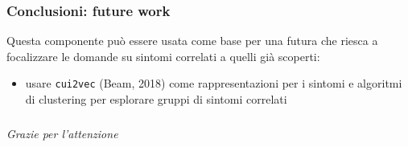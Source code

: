 \documentclass{beamer}
\begin{document}
\begin{frame}
\frametitle{Conclusioni: future work}
Questa componente può essere usata come base per una futura che riesca a focalizzare le domande su sintomi correlati a quelli già scoperti:
  \begin{itemize}\pause
  \item usare \texttt{cui2vec} (Beam, 2018) come rappresentazioni per i sintomi e algoritmi di clustering per esplorare gruppi di sintomi correlati
\end{itemize}
\end{frame}

\begin{frame}[plain, c]
\frametitle{}
\begin{center}
\Huge \emph{Grazie per l'attenzione}
\end{center}
\end{frame}
\end{document}
